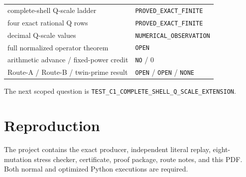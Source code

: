 \documentclass[11pt]{article}
\begin{document}
\begin{center}
\begin{tabular}{@{}ll@{}}
\toprule
complete-shell Q-scale ladder & \texttt{PROVED\_EXACT\_FINITE}\\
four exact rational Q rows & \texttt{PROVED\_EXACT\_FINITE}\\
decimal Q-scale values & \texttt{NUMERICAL\_OBSERVATION}\\
full normalized operator theorem & \texttt{OPEN}\\
arithmetic advance / fixed-power credit & \texttt{NO} / 0\\
Route-A / Route-B / twin-prime result & \texttt{OPEN} / \texttt{OPEN} / \texttt{NONE}\\
\bottomrule
\end{tabular}
\end{center}

The next scoped question is
\texttt{TEST\_C1\_COMPLETE\_SHELL\_Q\_SCALE\_EXTENSION}.

\section*{Reproduction}
The project contains the exact producer, independent literal replay,
eight-mutation stress checker, certificate, proof package, route notes, and
this PDF.  Both normal and optimized Python executions are required.
\end{document}
